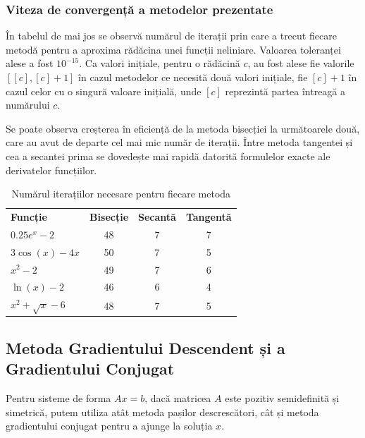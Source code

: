 \documentclass{exam}
\begin{document}
\subsubsection{Viteza de convergență a metodelor prezentate}

În tabelul de mai jos se observă numărul de iterații prin care a trecut fiecare
metodă pentru a aproxima rădăcina unei funcții neliniare. Valoarea toleranței
alese a fost $10^{-15}$. Ca valori inițiale, pentru o rădăcină $c$, au fost
alese fie valorile $[[c], [c] + 1]$ în cazul metodelor ce necesită două valori
inițiale, fie $[c] + 1$ în cazul celor cu o singură valoare inițială, unde
$[c]$ reprezintă partea întreagă a numărului $c$.

Se poate observa creșterea în eficiență de la metoda bisecției la următoarele
două, care au avut de departe cel mai mic număr de iterații. Între metoda
tangentei și cea a secantei prima se dovedește mai rapidă datorită formulelor
exacte ale derivatelor funcțiilor.

\newpage
\begin{table}
	\centering
	\label{tab:root_finding}
	\begin{tabular}{lccc}
		\textbf{Funcție}     & \textbf{Bisecție} & \textbf{Secantă} & \textbf{Tangentă} \\
		$0.25e^x - 2$        & 48                & 7                & 7                 \\
		$3\cos(x) - 4x$      & 50                & 7                & 5                 \\
		$x^2 - 2$            & 49                & 7                & 6                 \\
		$\ln(x) - 2$         & 46                & 6                & 4                 \\
		$ x^2 + \sqrt{x}- 6$ & 48                & 7                & 5                 \\
	\end{tabular}
	\caption{Numărul iterațiilor necesare pentru fiecare metoda}
\end{table}

\subsection{Metoda Gradientului Descendent și a Gradientului Conjugat}

Pentru sisteme de forma $Ax=b$, dacă matricea $A$ este pozitiv semidefinită și
simetrică, putem utiliza atât metoda pașilor descrescători, cât și metoda
gradientului conjugat pentru a ajunge la soluția $x$.
\end{document}

